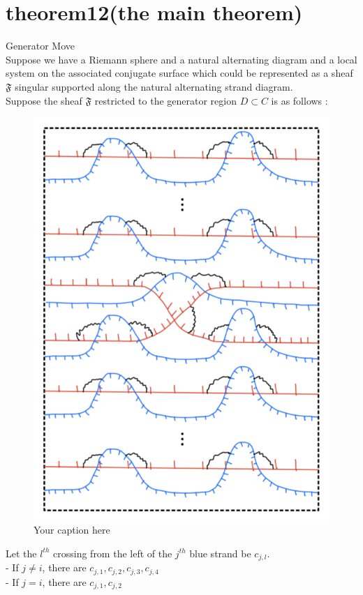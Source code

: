 \section{theorem12(the main theorem)}
\begin{theorem}
\end{theorem}

Generator Move\\

Suppose we have a Riemann sphere and a natural alternating diagram and a local system on the associated conjugate surface which could be represented as a sheaf $\mathfrak{F}$ singular supported along the natural alternating strand diagram.\\
Suppose the sheaf $\mathfrak{F}$ restricted to the generator region $D\subset C$ is as follows :

\begin{figure}[H] %
    \centering
    \includegraphics[width=\linewidth]{diagrams/theorem12/1.png} %
    \caption{Your caption here}
    \label{fig:your-label}
\end{figure}
Let the $l^{th}$ crossing from the left of the $j^{th}$ blue strand be $c_{j,l}$.\\
- If $j\neq i$, there are $c_{j,1},c_{j,2},c_{j,3},c_{j,4}$\\
- If $j= i$, there are $c_{j,1},c_{j,2}$\\

